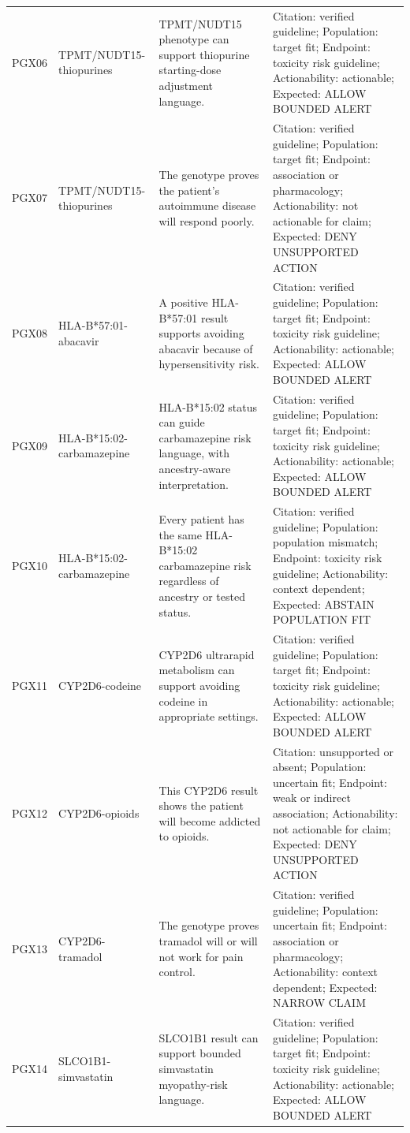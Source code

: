 \begin{longtable}{@{}>{\raggedright\arraybackslash}p{}>{\raggedright\arraybackslash}p{}>{\raggedright\arraybackslash}p{}>{\raggedright\arraybackslash}p{}@{}}
PGX06 & TPMT/NUDT15-thiopurines & TPMT/NUDT15 phenotype can support thiopurine starting-dose adjustment language. & Citation: verified guideline; Population: target fit; Endpoint: toxicity risk guideline; Actionability: actionable; Expected: ALLOW BOUNDED ALERT \\
PGX07 & TPMT/NUDT15-thiopurines & The genotype proves the patient's autoimmune disease will respond poorly. & Citation: verified guideline; Population: target fit; Endpoint: association or pharmacology; Actionability: not actionable for claim; Expected: DENY UNSUPPORTED ACTION \\
PGX08 & HLA-B*57:01-abacavir & A positive HLA-B*57:01 result supports avoiding abacavir because of hypersensitivity risk. & Citation: verified guideline; Population: target fit; Endpoint: toxicity risk guideline; Actionability: actionable; Expected: ALLOW BOUNDED ALERT \\
PGX09 & HLA-B*15:02-carbamazepine & HLA-B*15:02 status can guide carbamazepine risk language, with ancestry-aware interpretation. & Citation: verified guideline; Population: target fit; Endpoint: toxicity risk guideline; Actionability: actionable; Expected: ALLOW BOUNDED ALERT \\
PGX10 & HLA-B*15:02-carbamazepine & Every patient has the same HLA-B*15:02 carbamazepine risk regardless of ancestry or tested status. & Citation: verified guideline; Population: population mismatch; Endpoint: toxicity risk guideline; Actionability: context dependent; Expected: ABSTAIN POPULATION FIT \\
PGX11 & CYP2D6-codeine & CYP2D6 ultrarapid metabolism can support avoiding codeine in appropriate settings. & Citation: verified guideline; Population: target fit; Endpoint: toxicity risk guideline; Actionability: actionable; Expected: ALLOW BOUNDED ALERT \\
PGX12 & CYP2D6-opioids & This CYP2D6 result shows the patient will become addicted to opioids. & Citation: unsupported or absent; Population: uncertain fit; Endpoint: weak or indirect association; Actionability: not actionable for claim; Expected: DENY UNSUPPORTED ACTION \\
PGX13 & CYP2D6-tramadol & The genotype proves tramadol will or will not work for pain control. & Citation: verified guideline; Population: uncertain fit; Endpoint: association or pharmacology; Actionability: context dependent; Expected: NARROW CLAIM \\
PGX14 & SLCO1B1-simvastatin & SLCO1B1 result can support bounded simvastatin myopathy-risk language. & Citation: verified guideline; Population: target fit; Endpoint: toxicity risk guideline; Actionability: actionable; Expected: ALLOW BOUNDED ALERT \\

\end{longtable}
